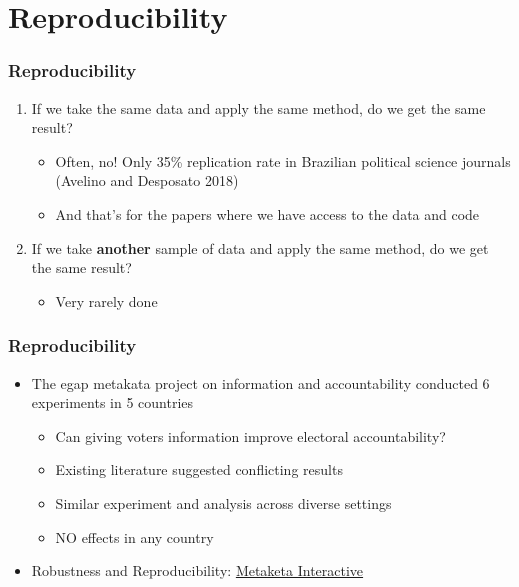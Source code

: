 \documentclass[xcolor=x11names,compress]{beamer}\usepackage[]{graphicx}\usepackage[]{xcolor}
\renewcommand{\(}{\begin{columns}}
\renewcommand{\)}{\end{columns}}
\newcommand{\<}[1]{\begin{column}{#1}}
\renewcommand{\>}{\end{column}}
\begin{document}
\section{Reproducibility}


\begin{frame}
\frametitle{Reproducibility}
\begin{enumerate}
\item If we take the same data and apply the same method, do we get the same result?
\pause
\begin{itemize}
\item Often, no! Only 35\% replication rate in Brazilian political science journals (Avelino and Desposato 2018)
\pause
\item And that's for the papers where we have access to the data and code
\pause
\end{itemize}
\item If we take \textbf{another} sample of data and apply the same method, do we get the same result?
\begin{itemize}
\item Very rarely done
\end{itemize}
\end{enumerate}
\end{frame}

\begin{frame}
\frametitle{Reproducibility}
\begin{itemize}
\item The egap metakata project on information and accountability conducted 6 experiments in 5 countries
\pause
\begin{itemize}
\item Can giving voters information improve electoral accountability?
\item Existing literature suggested conflicting results
\item Similar experiment and analysis across diverse settings
\pause
\item NO effects in any country
\end{itemize}
\pause
\item Robustness and Reproducibility: \href{https://egap.shinyapps.io/metaketa_shiny/}{Metaketa Interactive}
\end{itemize}
\end{frame}
\end{document}
